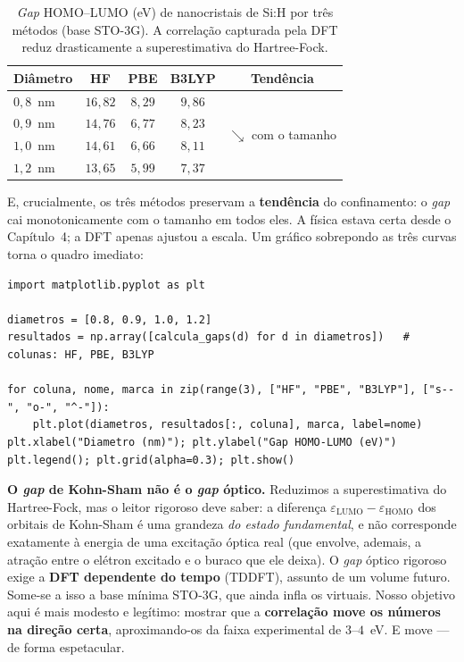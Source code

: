 \begin{table}[h]
  \centering
  \caption{\emph{Gap} HOMO--LUMO (eV) de nanocristais de Si:H por três métodos
  (base STO-3G). A correlação capturada pela DFT reduz drasticamente a
  superestimativa do Hartree-Fock.}
  \label{tab:gapmetodos}
  \begin{tabular}{lcccc}
    \toprule
    \textbf{Diâmetro} & \textbf{HF} & \textbf{PBE} & \textbf{B3LYP}
                      & \textbf{Tendência} \\
    \midrule
    $0{,}8$~nm & $16{,}82$ & $8{,}29$ & $9{,}86$ & \multirow{4}{*}{$\searrow$ com o tamanho} \\
    $0{,}9$~nm & $14{,}76$ & $6{,}77$ & $8{,}23$ & \\
    $1{,}0$~nm & $14{,}61$ & $6{,}66$ & $8{,}11$ & \\
    $1{,}2$~nm & $13{,}65$ & $5{,}99$ & $7{,}37$ & \\
    \bottomrule
  \end{tabular}
\end{table}

\noindent
E, crucialmente, os três métodos preservam a \textbf{tendência} do confinamento: o
\emph{gap} cai monotonicamente com o tamanho em todos eles. A física estava certa
desde o Capítulo~4; a DFT apenas ajustou a escala. Um gráfico sobrepondo as três
curvas torna o quadro imediato:

\begin{lstlisting}[style=python]
import matplotlib.pyplot as plt

diametros = [0.8, 0.9, 1.0, 1.2]
resultados = np.array([calcula_gaps(d) for d in diametros])   # colunas: HF, PBE, B3LYP

for coluna, nome, marca in zip(range(3), ["HF", "PBE", "B3LYP"], ["s--", "o-", "^-"]):
    plt.plot(diametros, resultados[:, coluna], marca, label=nome)
plt.xlabel("Diametro (nm)"); plt.ylabel("Gap HOMO-LUMO (eV)")
plt.legend(); plt.grid(alpha=0.3); plt.show()
\end{lstlisting}

\begin{caixaatencao}
\textbf{O \emph{gap} de Kohn-Sham não é o \emph{gap} óptico.} Reduzimos a
superestimativa do Hartree-Fock, mas o leitor rigoroso deve saber: a diferença
$\varepsilon_{\text{LUMO}} - \varepsilon_{\text{HOMO}}$ dos orbitais de Kohn-Sham é
uma grandeza \emph{do estado fundamental}, e não corresponde exatamente à energia
de uma excitação óptica real (que envolve, ademais, a atração entre o elétron
excitado e o buraco que ele deixa). O \emph{gap} óptico rigoroso exige a
\textbf{DFT dependente do tempo} (TDDFT), assunto de um volume futuro. Some-se a
isso a base mínima STO-3G, que ainda infla os virtuais. Nosso objetivo aqui é mais
modesto e legítimo: mostrar que a \textbf{correlação move os números na direção
certa}, aproximando-os da faixa experimental de $3$--$4$~eV. E move --- de forma
espetacular.
\end{caixaatencao}

